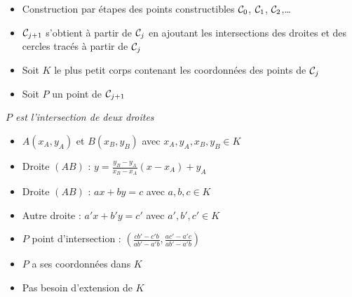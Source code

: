 \begin{frame}


\pause

\begin{itemize}
  \item Construction par étapes des points constructibles  $\mathcal{C}_0$, $\mathcal{C}_1$, $\mathcal{C}_2$,\ldots
 \pause 
  \item $\mathcal{C}_{j+1}$ s'obtient à partir de $\mathcal{C}_j$ en ajoutant 
  les intersections des droites et des cercles tracés à partir de $\mathcal{C}_j$
\pause  
  \item Soit $K$ le plus petit corps contenant les coordonnées des points de $\mathcal{C}_j$
\pause  
  \item Soit $P$ un point de $\mathcal{C}_{j+1}$
\end{itemize}

\pause
{} \emph{$P$ est l'intersection de deux droites}

\pause
\begin{itemize}[<+->]

  \item $A(x_A,y_A)$ et $B(x_B,y_B)$ avec $x_A,y_A,x_B,y_B \in K$
  \item Droite $(AB)$ : $y = \frac{y_B-y_A}{x_B-x_A} (x-x_A) + y_A$ 
  \item Droite $(AB)$ : $ax+by=c$ avec $a,b,c \in K$
  \item Autre droite : $a'x+b'y=c'$ avec $a',b',c' \in K$
  \item $P$ point d'intersection : $\left(\frac{cb'-c'b}{ab'-a'b} , \frac{ac'-a'c}{ab'-a'b} \right)$
  \item $P$ a ses coordonnées dans $K$
  \item Pas besoin d'extension de $K$
\end{itemize}

\end{frame}


